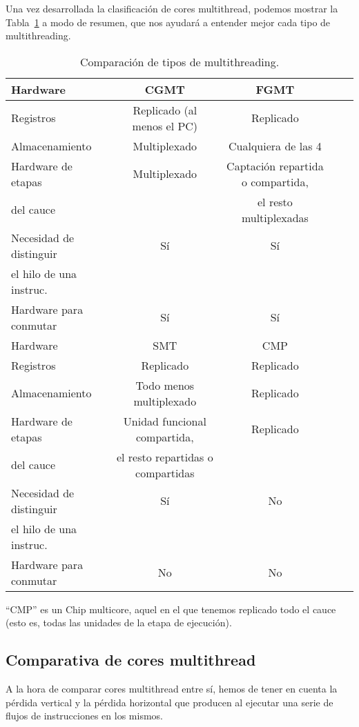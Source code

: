 Una vez desarrollada la clasificación de cores multithread, podemos mostrar la Tabla~\ref{tab:resumen_multithreading} a modo de resumen, que nos ayudará a entender mejor cada tipo de multithreading.
\begin{table}
\footnotesize
\centering
\setlength{\tabcolsep}{4pt}
\begin{tabular}{l c c c c}
    \toprule
    Hardware & CGMT & FGMT \\ 
    \midrule
    Registros & Replicado (al menos el PC) & Replicado \\
    \midrule
    Almacenamiento & Multiplexado & Cualquiera de las 4 \\
    \midrule
    Hardware de etapas & Multiplexado & Captación repartida o compartida, \\
    del cauce & & el resto multiplexadas \\
    \midrule
    Necesidad de distinguir & Sí & Sí \\
    el hilo de una instruc. & & \\
    \midrule
    Hardware para conmutar & Sí & Sí \\
    \toprule %
    Hardware & SMT & CMP \\ 
    \midrule
    Registros & Replicado & Replicado \\
    \midrule
    Almacenamiento & Todo menos multiplexado & Replicado \\
    \midrule
    Hardware de etapas & Unidad funcional compartida, & Replicado \\
    del cauce & el resto repartidas o compartidas & \\
    \midrule
    Necesidad de distinguir & Sí & No \\
    el hilo de una instruc. & & \\
    \midrule
    Hardware para conmutar & No & No \\
    \bottomrule
\end{tabular}
\caption{Comparación de tipos de multithreading.}
\label{tab:resumen_multithreading}
\end{table}
``CMP'' es un Chip multicore, aquel en el que tenemos replicado todo el cauce (esto es, todas las unidades de la etapa de ejecución).

\subsection{Comparativa de cores multithread}
A la hora de comparar cores multithread entre sí, hemos de tener en cuenta la pérdida vertical y la pérdida horizontal que producen al ejecutar una serie de flujos de instrucciones en los mismos.

